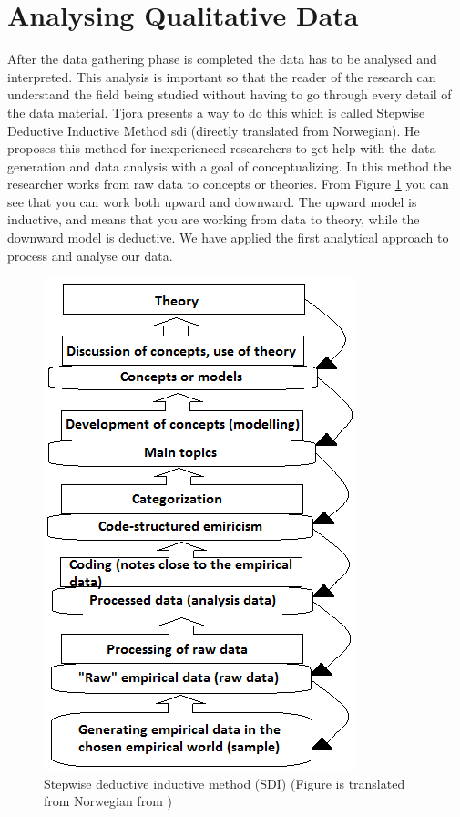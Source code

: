 \section{Analysing Qualitative Data}
After the data gathering phase is completed the data has to be analysed and interpreted. This analysis is important so that the reader of the research can understand the field being studied without having to go through every detail of the data material. Tjora \cite{tjora} presents a way to do this which is called Stepwise Deductive Inductive Method \ac{sdi} (directly translated from Norwegian). He proposes this method for inexperienced researchers to get help with the data generation and data analysis with a goal of conceptualizing. In this method the researcher works from raw data to concepts or theories. From Figure \ref{fig:sdi} you can see that you can work both upward and downward. The upward model is inductive, and means that you are working from data to theory, while the downward model is deductive. We have applied the first analytical approach to process and analyse our data.

\begin{figure}
\centering
\includegraphics[scale=0.8]{sdi}
\caption[Stepwise deductive inductive method (SDI)]{Stepwise deductive inductive method (SDI) (Figure is translated from Norwegian from \cite{tjora})}
\label{fig:sdi}
\end{figure}

